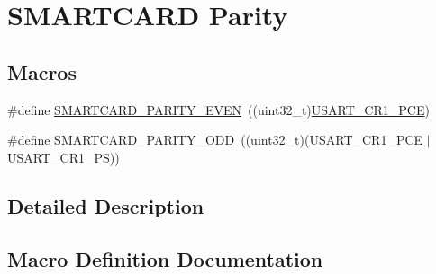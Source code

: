 \hypertarget{group___s_m_a_r_t_c_a_r_d___parity}{}\section{S\+M\+A\+R\+T\+C\+A\+RD Parity}
\label{group___s_m_a_r_t_c_a_r_d___parity}
\subsection*{Macros}
\begin{DoxyCompactItemize}
\item 
\#define \hyperlink{group___s_m_a_r_t_c_a_r_d___parity_ga94ae871b29c18b59dab9a045443d11c8}{S\+M\+A\+R\+T\+C\+A\+R\+D\+\_\+\+P\+A\+R\+I\+T\+Y\+\_\+\+E\+V\+EN}~((uint32\+\_\+t)\hyperlink{group___peripheral___registers___bits___definition_ga60f8fcf084f9a8514efafb617c70b074}{U\+S\+A\+R\+T\+\_\+\+C\+R1\+\_\+\+P\+CE})
\item 
\#define \hyperlink{group___s_m_a_r_t_c_a_r_d___parity_gaef2239030beeb07577e43965b013f65d}{S\+M\+A\+R\+T\+C\+A\+R\+D\+\_\+\+P\+A\+R\+I\+T\+Y\+\_\+\+O\+DD}~((uint32\+\_\+t)(\hyperlink{group___peripheral___registers___bits___definition_ga60f8fcf084f9a8514efafb617c70b074}{U\+S\+A\+R\+T\+\_\+\+C\+R1\+\_\+\+P\+CE} $\vert$ \hyperlink{group___peripheral___registers___bits___definition_ga2e159d36ab2c93a2c1942df60e9eebbe}{U\+S\+A\+R\+T\+\_\+\+C\+R1\+\_\+\+PS}))
\end{DoxyCompactItemize}


\subsection{Detailed Description}


\subsection{Macro Definition Documentation}
\mbox{\label{group___s_m_a_r_t_c_a_r_d___parity_ga94ae871b29c18b59dab9a045443d11c8}} 
